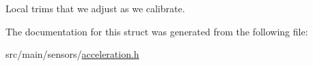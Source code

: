 Local trims that we adjust as we calibrate. 



The documentation for this struct was generated from the following file\+:\begin{DoxyCompactItemize}
\item 
src/main/sensors/\hyperlink{acceleration_8h}{acceleration.\+h}\end{DoxyCompactItemize}
